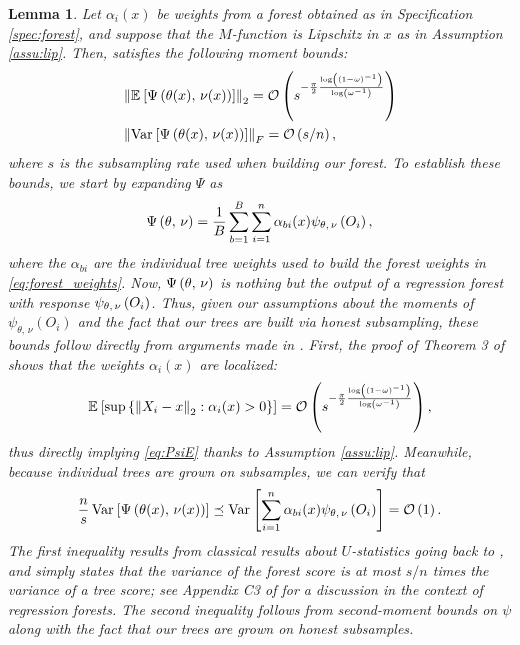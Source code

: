 \documentclass[aos]{imsart}
\theoremstyle{plain}
\newtheorem{lemm}[prop]{Lemma}
\theoremstyle{definition}
\theoremstyle{remark}
\begin{document}
\begin{CJK}{UTF8}{gbsn}
{\begin{appendix}
\begin{lemm}
\label{lemm:moments}
Let $\alpha_i(x)$ be weights from a forest obtained as in Specification \ref{spec:forest},
and suppose that the $M$-function is Lipschitz in $x$ as in Assumption \ref{assu:lip}.
Then,  satisfies the following moment bounds:
\begin{align}
\label{eq:PsiE}
&\Norm{\EE{\Psi\p{\theta(x), \, \nu(x)}}}_2 =  \oo\p{s^{-\frac{\pi}{2}\frac{\log\p{\p{1 - \omega}^{-1}}}{\log\p{\omega^{-1}}}}} \\
\label{eq:PsiV}
&\Norm{\Var{\Psi\p{\theta(x), \, \nu(x)}}}_F = \oo\p{s/n},
\end{align}
where $s$ is the subsampling rate used when building our forest.
\proof
To establish these bounds, we start by expanding $\Psi$ as
\begin{equation}
\Psi\p{\theta, \, \nu} = \frac{1}{B} \sum_{b = 1}^B \sum_{i = 1}^n \alpha_{bi}(x) \psi_{\theta, \, \nu}\p{O_i},
\end{equation}
where the $\alpha_{bi}$ are the individual tree weights used to build the forest weights in \eqref{eq:forest_weights}.
Now, $\Psi\left(\theta, \, \nu\right)$ is nothing but the output of a regression forest with response
$\psi_{\theta, \, \nu}\left(O_i\right)$. Thus, given our assumptions about the moments of $\psi_{\theta, \, \nu}(O_i)$
and the fact that our trees are built via honest subsampling, these bounds follow directly from arguments
made in \citet{wager2015estimation}. First, the proof of Theorem 3 of \citet{wager2015estimation}
shows that the weights $\alpha_i(x)$ are localized:
\begin{equation}
\label{eq:local_weights}
\EE{\sup\cb{\Norm{X_i - x}_2 : \alpha_i(x) > 0}} = \oo\p{s^{-\frac{\pi}{2}\frac{\log\p{\p{1 - \omega}^{-1}}}{\log\p{\omega^{-1}}}}},
\end{equation}
thus directly implying \eqref{eq:PsiE} thanks to Assumption \ref{assu:lip}.
Meanwhile, because individual trees are grown on subsamples,
we can verify that
\begin{equation}
\frac{n}{s} \Var{\Psi\p{\theta(x), \, \nu(x)}} \preceq \Var{\sum_{i = 1}^n \alpha_{bi}(x) \psi_{\theta, \, \nu}\p{O_i}} = \oo\p{1}.
\end{equation}
The first inequality results from classical results about $U$-statistics going back to
\citet{hoeffding1948class}, and simply states that the variance of the forest score is at most
$s/n$ times the variance of a tree score; see Appendix C3 of \citet{wager2015estimation} for
a discussion in the context of regression forests.
The second inequality follows from second-moment bounds on $\psi$
along with the fact that our trees are grown on honest subsamples.
\endproof
\end{lemm}



\end{appendix}}
\end{CJK}
\end{document}
